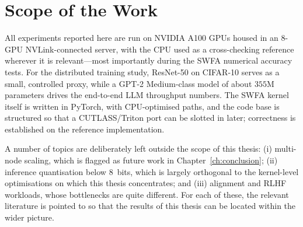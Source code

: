 \section{Scope of the Work}\label{sec:intro_scope}
All experiments reported here are run on NVIDIA A100 GPUs housed in
an 8-GPU NVLink-connected server, with the CPU used as a
cross-checking reference wherever it is relevant---most importantly
during the SWFA numerical accuracy tests. For the distributed
training study, ResNet-50 on CIFAR-10 serves as a small, controlled
proxy, while a GPT-2 Medium-class model of about $355$M parameters
drives the end-to-end LLM throughput numbers. The SWFA kernel itself
is written in PyTorch, with CPU-optimised paths, and the code base
is structured so that a CUTLASS/Triton port can be slotted in later;
correctness is established on the reference implementation.

A number of topics are deliberately left outside the scope of this
thesis: (i) multi-node scaling, which is flagged as future work in
Chapter~\ref{ch:conclusion}; (ii) inference quantisation below
$8$~bits, which is largely orthogonal to the kernel-level
optimisations on which this thesis concentrates; and
(iii) alignment and RLHF workloads, whose bottlenecks are quite
different. For each of these, the relevant literature is pointed to
so that the results of this thesis can be located within the wider
picture.

